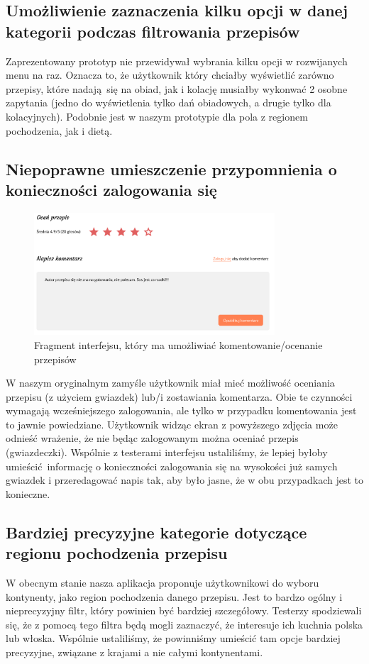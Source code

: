 \documentclass{article}
\begin{document}
\subsection{Umożliwienie zaznaczenia kilku opcji w danej kategorii podczas filtrowania przepisów} 
Zaprezentowany prototyp nie przewidywał wybrania kilku opcji w rozwijanych menu na raz. Oznacza to, że użytkownik który chciałby wyświetlić zarówno przepisy, które nadają się
na obiad, jak i kolację musiałby wykonwać 2 osobne zapytania (jedno do wyświetlenia tylko dań obiadowych, a drugie tylko dla kolacyjnych). Podobnie jest w naszym prototypie 
dla pola z regionem pochodzenia, jak i dietą.

\subsection{Niepoprawne umieszczenie przypomnienia o konieczności zalogowania się}
\begin{figure}[H]
    \begin{center}
        \includegraphics[width=0.8\textwidth]{images/review-item_2}
    \end{center}
    \caption{Fragment interfejsu, który ma umożliwiać komentowanie/ocenanie przepisów}
\end{figure}

W naszym oryginalnym zamyśle użytkownik miał mieć możliwość oceniania przepisu (z użyciem gwiazdek) lub/i zostawiania komentarza. Obie te czynności wymagają wcześniejszego zalogowania, ale
tylko w przypadku komentowania jest to jawnie powiedziane. Użytkownik widząc ekran z powyższego zdjęcia może odnieść wrażenie, że nie będąc zalogowanym można oceniać przepis (gwiazdeczki).
Wspólnie z testerami interfejsu ustaliliśmy, że lepiej byłoby umieścić informację o konieczności zalogowania się na wysokości już samych gwiazdek i przeredagować napis tak, aby było 
jasne, że w obu przypadkach jest to konieczne.

\subsection{Bardziej precyzyjne kategorie dotyczące regionu pochodzenia przepisu}
W obecnym stanie nasza aplikacja proponuje użytkownikowi do wyboru kontynenty, jako region pochodzenia danego przepisu. Jest to bardzo ogólny i nieprecyzyjny filtr, który powinien
być bardziej szczegółowy. Testerzy spodziewali się, że z pomocą tego filtra będą mogli zaznaczyć, że interesuje ich kuchnia polska lub włoska. Wspólnie ustaliliśmy, że powinniśmy 
umieścić tam opcje bardziej precyzyjne, związane z krajami a nie całymi kontynentami.
\end{document}
